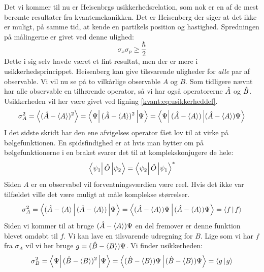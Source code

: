 \documentclass[../Kvantemekanik.tex]{subfiles}
\begin{document}
Det vi kommer til nu er Heisenbrgs usikkerhedsrelation, som nok er en af de mest berømte resultater fra kvantemekanikken. Det er Heisenberg der siger at det ikke er muligt, på samme tid, at kende en partikels position og hastighed. Spredningen på målingerne er givet ved denne ulighed:
\begin{equation}
\sigma_x\sigma_p \geq \frac{\hbar}{2}
\label{kvant:eq:heisenbergxp}
\end{equation}
Dette i sig selv havde været et fint resultat, men der er mere i usikkerhedsprincippet. Heisenberg kan give tilsvarende uligheder for {\em alle} par af observable. Vi vil nu se på to vilkårlige observable $A$ og $B$. Som tidligere nævnt har alle observable en tilhørende operator, så vi har også operatorerne $\hat A$ og $\hat B$. Usikkerheden vil her være givet ved ligning \eqref{kvant:eq:usikkerheddef}.
\begin{equation}
    \sigma_A^2 = \expect{(\op A - \expect A)^2} = \matrixel{\Psi}{(\op A-\expect A)^2}{\Psi} = \matrixel{\Psi}{(\op A-\expect A)}{(\op A-\expect A)\Psi}
\end{equation}
I det sidste skridt har den ene afvigelses operator fået lov til at virke på bølgefunktionen. En spidsfindighed er at hvis man bytter om på bølgefunktionerne i en braket svarer det til at komplekskonjugere de hele:
$$
\matrixel{\psi_1}{\op O}{\psi_2} = \matrixel{\psi_2}{\op O}{\psi_1}^*
$$
Siden $A$ er en observabel vil forventningsværdien være reel. Hvis det ikke var tilfældet ville det være muligt at måle komplekse størrelser.
\begin{equation}
    \sigma_A^2 = \matrixel{(\op A - \expect A}{(\op A - \expect A)}{\Psi} = \braket{(\op A-\expect A)\Psi}{(\op A-\expect A)\Psi}= \braket{f}{f}
\end{equation}
Siden vi kommer til at bruge $(\hat A-\left< A \right>)\Psi$ en del fremover er denne funktion blevet omdøbt til $f$.
Vi kan lave en tilsvarende udregning for $B$. Lige som vi har $f$ fra $\sigma_A$ vil vi her bruge $g=(\hat B -\left< B \right>)\Psi$. Vi finder usikkerheden:
\begin{equation}
    \sigma_B^2 = \matrixel{\Psi}{(\op B-\expect B)^2}{\Psi} = \braket{(\op B-\expect B)\Psi}{(\op B-\expect B)\Psi}= \braket{g}{g}
\end{equation}
\end{document}
